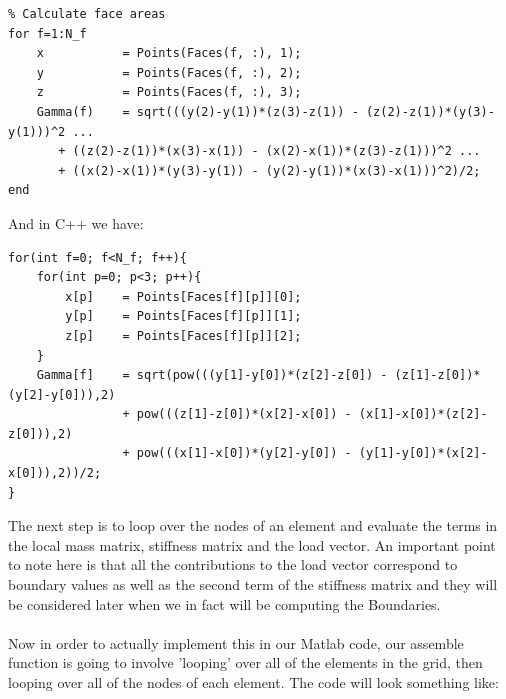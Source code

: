 \documentclass[12pt]{article}
\begin{document}
\begin{lstlisting}
% Calculate face areas
for f=1:N_f	
	x           = Points(Faces(f, :), 1);
	y           = Points(Faces(f, :), 2);
	z           = Points(Faces(f, :), 3);
	Gamma(f)	= sqrt(((y(2)-y(1))*(z(3)-z(1)) - (z(2)-z(1))*(y(3)-y(1)))^2 ... 
	   + ((z(2)-z(1))*(x(3)-x(1)) - (x(2)-x(1))*(z(3)-z(1)))^2 ...
	   + ((x(2)-x(1))*(y(3)-y(1)) - (y(2)-y(1))*(x(3)-x(1)))^2)/2;
end
\end{lstlisting}

And in C++ we have:

\begin{lstlisting}[style=MyC++Style]
for(int f=0; f<N_f; f++){
	for(int p=0; p<3; p++){
		x[p]	= Points[Faces[f][p]][0];
		y[p]	= Points[Faces[f][p]][1];
		z[p]	= Points[Faces[f][p]][2];
	}
	Gamma[f]	= sqrt(pow(((y[1]-y[0])*(z[2]-z[0]) - (z[1]-z[0])*(y[2]-y[0])),2)
				+ pow(((z[1]-z[0])*(x[2]-x[0]) - (x[1]-x[0])*(z[2]-z[0])),2)
				+ pow(((x[1]-x[0])*(y[2]-y[0]) - (y[1]-y[0])*(x[2]-x[0])),2))/2;
}
\end{lstlisting}

The next step is to loop over the nodes of an element and evaluate the terms in the local mass matrix, stiffness matrix and the load vector. An important point to note here is that all the contributions to the load vector correspond to boundary values as well as the second term of the stiffness matrix and they will be considered later when we in fact will be computing the Boundaries. \cite{Steve13}
\\\\
Now in order to actually implement this in our Matlab code, our assemble function is going to involve 'looping' over all of
the elements in the grid, then looping over all of the nodes of each element. The code will look something like:
\end{document}
